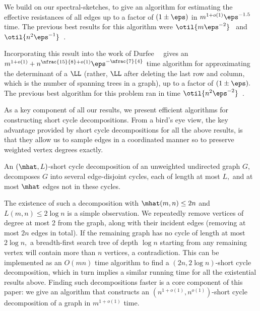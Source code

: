 \begin{tight_enumerate}
\item We build on our spectral-sketches, to give an algorithm for
  estimating the effective resistances of all edges up to a factor of
  $(1\pm \eps)$ in $m^{1+o(1)}\eps^{-1.5}$ time. The previous best
  results for this algorithm were
  $\otil{m\eps^{-2}}$~\cite{SpielmanS08:journal} and
  $\otil{n^{2}\eps^{-1}}$~\cite{JambulapatiS18}.


  Incorporating this result into the work of
  Durfee~\etal~\cite{DurfeePPR17} gives an
  $m^{1+o(1)} + n^{\nfrac{15}{8} + o(1)}\eps^{-\nfrac{7}{4}}$ time algorithm for
  approximating the determinant of a $\LL$ (rather, $\LL$ after
  deleting the last row and column, which is the number of spanning
  trees in a graph), up to a factor of $(1\pm\eps).$ The previous best
  algorithm for this problem ran in time
  $\otil{n^{2}\eps^{-2}}$~\cite{DurfeeKPRS17}.
\end{tight_enumerate}

As a key component of all our results, we present efficient algorithms
for constructing short cycle decompositions. From a bird's eye view,
the key advantage provided by short cycle decompositions for all the
above results, is that they allow us to sample edges in a coordinated
manner so to preserve weighted vertex degrees exactly.
%
\begin{definition}
\label{def:ShortCycleDecomposition}
An $(\mhat, L)$-short cycle decomposition of an unweighted undirected
graph $G$, decomposes $G$ into several edge-disjoint cycles, each of
length at most $L,$ and at most $\mhat$ edges not in these cycles.
\end{definition}
The existence of such a decomposition  with $\mhat(m, n) \leq 2n$
and $L(m, n) \leq 2\log{n}$ is a simple observation.
We repeatedly remove vertices of degree at most 2 from the graph,
along with their incident edges (removing at most $2n$ edges in total).
If the remaining graph has no cycle of length at most $2 \log n,$
a breadth-first search tree
of depth $\log n$ starting from any remaining vertex will contain more
than $n$ vertices, a contradiction. This can be implemented as an
$O(mn)$ time algorithm to find a $(2n, 2\log n)$-short cycle
decomposition, which in turn implies a similar running time
for all the existential results above.
Finding such decompositions faster is a core component of this paper:
we give an algorithm that constructs an $(n^{1+o(1)},n^{o(1)})$-short
cycle decomposition of a graph in $m^{1+o(1)}$ time.

